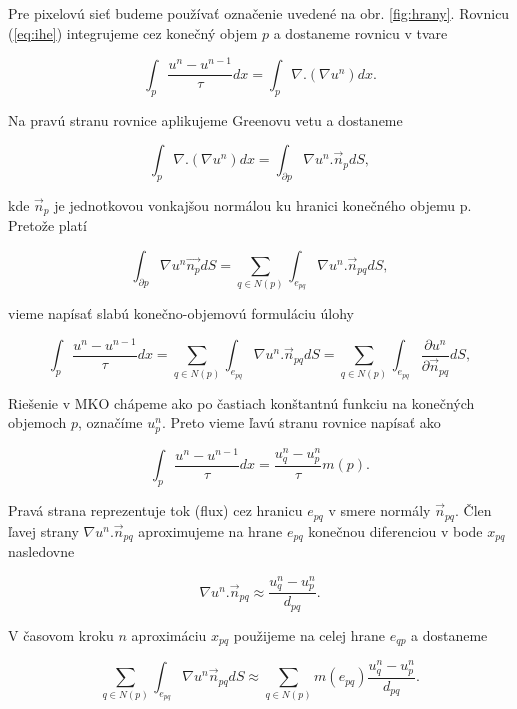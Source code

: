 \documentclass[a4paper,12pt,twoside]{article}%
\begin{document}
Pre pixelovú sieť budeme používať označenie uvedené na obr. \ref{fig:hrany}.
Rovnicu (\ref{eq:ihe}) integrujeme cez konečný objem $p$ a dostaneme rovnicu v tvare

\begin{equation} 
\int_p\frac{u^n - u^{n-1}}{\tau} dx = \int_p\nabla . (\nabla u^n)dx.
\end{equation}

Na pravú stranu rovnice aplikujeme Greenovu vetu a dostaneme

\begin{equation} 
\int_p\nabla . (\nabla u^n)dx = \int_{\partial p} \nabla u^n . \vec{n}_pdS,
\end{equation}

kde $\vec{n}_p$ je jednotkovou vonkajšou normálou ku hranici konečného objemu p.
Pretože platí

\begin{equation} 
\int_{\partial p} \nabla u^n \vec{n_p}dS = \sum_{q\in N(p)}\int_{e_{pq}} \nabla u^n . \vec{n}_{pq}dS,
\end{equation}

vieme napísať slabú konečno-objemovú formuláciu úlohy

\begin{equation} 
\int_p\frac{u^n - u^{n-1}}{\tau} dx = \sum_{q\in N(p)}\int_{e_{pq}} \nabla u^n . \vec{n}_{pq}dS = \sum_{q\in N(p)}\int_{e_{pq}} \frac{\partial u^n}{\partial \vec{n}_{pq}} dS,
\end{equation}

Riešenie v MKO chápeme ako po častiach konštantnú funkciu na konečných objemoch $p$, označíme $u_p^n$. Preto vieme ľavú stranu rovnice napísať ako 

\begin{equation} 
\int_p\frac{u^n - u^{n-1}}{\tau} dx = \frac{u^n_q - u^n_p}{\tau} m(p).
\end{equation}

Pravá strana reprezentuje tok (flux) cez hranicu $e_{pq}$ v smere normály $\vec{n}_{pq}$. Člen ľavej strany $\nabla u^n . \vec{n}_{pq}$ aproximujeme na hrane $e_{pq}$ konečnou diferenciou v bode $x_{pq}$ nasledovne

\begin{equation}
\nabla u^n . \vec{n}_{pq} \approx \frac{u^n_q - u^n_p}{d_{pq}}.
\end{equation}

V časovom kroku $n$ aproximáciu $x_{pq}$ použijeme na celej hrane $e_{qp}$ a dostaneme

\begin{equation}
\sum_{q\in N(p)} \int_{e_{pq}} \nabla u^n \vec{n}_{pq} dS \approx \sum_{q\in N(p)} m(e_{pq})\frac{u^n_q - u^n_p}{d_{pq}}.
\end{equation}
\end{document}
